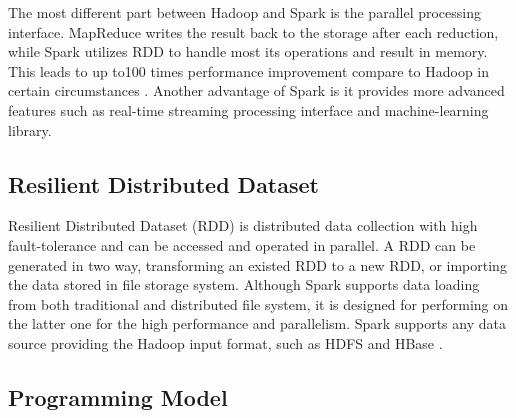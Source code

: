 The most different part between Hadoop and Spark is the parallel processing interface. MapReduce writes the result back to the storage after each reduction, while Spark utilizes RDD to handle most its operations and result in memory. This leads to up to100 times performance improvement compare to Hadoop in certain circumstances \cite{ApacheSpark}. Another advantage of Spark is it provides more advanced features such as real-time streaming processing interface and machine-learning library.

\subsection{Resilient Distributed Dataset}

Resilient Distributed Dataset (RDD) is distributed data collection with high fault-tolerance and can be accessed and operated in parallel. A RDD can be generated in two way, transforming an existed RDD to a new RDD, or importing the data stored in file storage system. Although Spark supports data loading from both traditional and distributed file system, it is designed for performing on the latter one for the high performance and parallelism. Spark supports any data source providing the Hadoop input format, such as HDFS and HBase \cite{ApacheSpark}.




\subsection{Programming Model}






